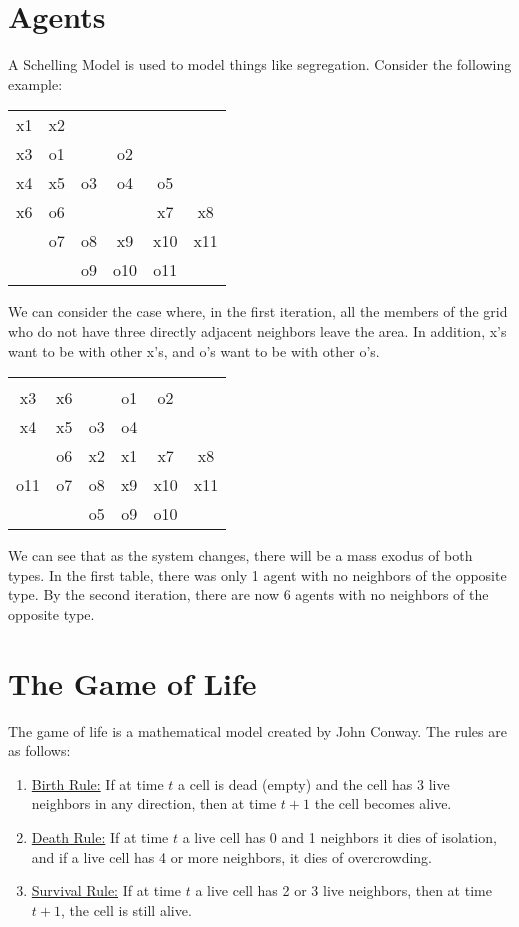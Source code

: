 \documentclass{hw}
\begin{document}
\section{Agents}
A Schelling Model is used to model things like segregation. Consider the following example:
\begin{center}
\begin{tabular}{c c c c c c}
x1 & x2 &    &    &    &    \\
x3 & o1 &    & o2 &    &    \\
x4 & x5 & o3 & o4 & o5 &    \\
x6 & o6 &    &    & x7 & x8 \\
   & o7 & o8 & x9 & x10 & x11 \\
   &    & o9 & o10 & o11 & \\
\end{tabular}
\end{center}
We can consider the case where, in the first iteration, all the members of the grid who do not have
three directly adjacent neighbors leave the area. In addition, x's want to be with other x's, and
o's want to be with other o's.
\begin{center}
\begin{tabular}{c c c c c c}
   &    &    &    &    &    \\
x3 & x6 &    & o1 & o2 &    \\
x4 & x5 & o3 & o4 &    &    \\
   & o6 & x2 & x1 & x7 & x8 \\
o11& o7 & o8 & x9 & x10 & x11 \\
   &    & o5 & o9 & o10 & \\
\end{tabular}
\end{center}
We can see that as the system changes, there will be a mass exodus of both types. In the first table,
there was only 1 agent with no neighbors of the opposite type. By the second iteration, there are now 6
agents with no neighbors of the opposite type.

\section{The Game of Life}
The game of life is a mathematical model created by John Conway. The rules are as follows:
\begin{enumerate}
\item \underline{Birth Rule:} If at time $t$ a cell is dead (empty) and the cell has 3 live neighbors
in any direction, then at time $t+1$ the cell becomes alive.
\item \underline{Death Rule:} If at time $t$ a live cell has 0 and 1 neighbors it dies of isolation,
and if a live cell has 4 or more neighbors, it dies of overcrowding.
\item \underline{Survival Rule:} If at time $t$ a live cell has 2 or 3 live neighbors, then at time
$t+1$, the cell is still alive.
\end{enumerate}
\end{document}
